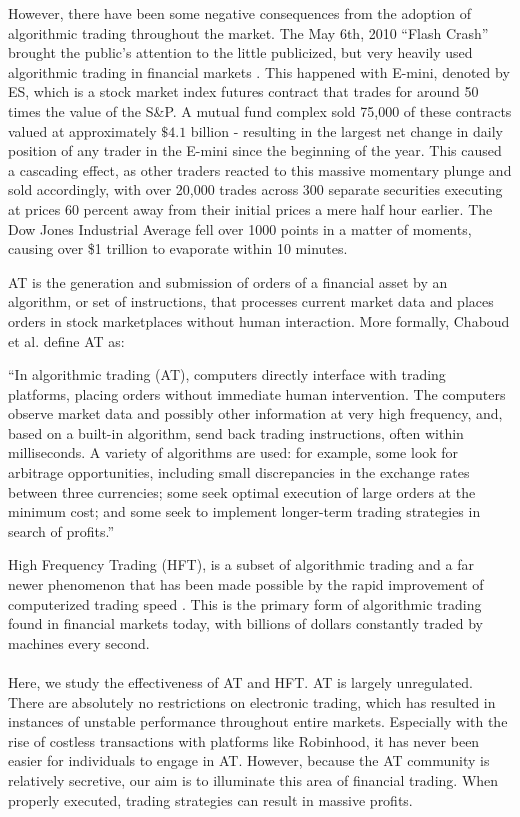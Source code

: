 \documentclass[letterpaper,11pt]{article}
\begin{document}
However, there have been some negative consequences from the adoption of algorithmic trading throughout the market. The May 6th, 2010 ``Flash Crash'' brought the public's attention to the little publicized, but very heavily used algorithmic trading in financial markets \cite{Kirilenko2017}. This happened with E-mini, denoted by ES, which is a stock market index futures contract that trades for around 50 times the value of the S\&P. A mutual fund complex sold 75,000 of these contracts valued at approximately $\$4.1$ billion - resulting in the largest net change in daily position of any trader in the E-mini since the beginning of the year. This caused a cascading effect, as other traders reacted to this massive momentary plunge and sold accordingly, with over 20,000 trades across 300 separate securities executing at prices 60 percent away from their initial prices a mere half hour earlier. The Dow Jones Industrial Average fell over 1000 points in a matter of moments, causing over \$1 trillion to evaporate within 10 minutes. 

AT is the generation and submission of orders of a financial asset by an algorithm, or set of instructions, that processes current market data and places orders in stock marketplaces without human interaction. More formally, Chaboud et al. define AT as: \begin{displayquote} ``In algorithmic trading (AT), computers directly interface with trading platforms, placing orders without immediate human intervention. The computers observe market data and possibly other information at very high frequency, and, based on a built-in algorithm, send back trading instructions, often within milliseconds. A variety of algorithms are used: for example, some look for arbitrage opportunities,
including small discrepancies in the exchange rates between three currencies; some
seek optimal execution of large orders at the minimum cost; and some seek to
implement longer-term trading strategies in search of profits.'' \end{displayquote} 

High Frequency Trading (HFT), is a subset of algorithmic trading and a far newer phenomenon that has been made possible by the rapid improvement of computerized trading speed \cite{Gomber2011}. This is the primary form of algorithmic trading found in financial markets today, with billions of dollars constantly traded by machines every second. 

\paragraph{} Here, we study the effectiveness of AT and HFT. AT is largely unregulated. There are absolutely no restrictions on electronic trading, which has resulted in instances of unstable performance throughout entire markets. Especially with the rise of costless transactions with platforms like Robinhood, it has never been easier for individuals to engage in AT. However, because the AT community is relatively secretive, our aim is to illuminate this area of financial trading. When properly executed, trading strategies can result in massive profits. 
\end{document}
